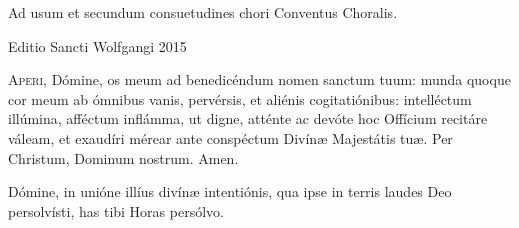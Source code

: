 \documentclass[a4paper, twoside, 12pt]{article}
\newcommand{\annusEditionis}{2015}
\begin{document}

\def\greinitialformat#1{%
{\color{red}\fontsize{38}{38}\selectfont #1}%
}

\pagestyle{empty}

\begin{titulusOfficii}
\end{titulusOfficii}

\vspace{1.5cm}
\begin{center}
\end{center}

\vfill

\begin{center}
Ad usum et secundum consuetudines chori \guillemotright{}Conventus Choralis\guillemotleft.

Editio Sancti Wolfgangi \annusEditionis
\end{center}

\pagebreak

\renewcommand{\headrulewidth}{0pt} %
\fancyhf{}
\pagestyle{fancy}


\lettrine{{\color{red}A}}{peri,} Dómine, os meum ad benedicéndum nomen sanctum tuum:
munda quoque cor meum ab ómnibus vanis, pervérsis, et aliénis
cogitatiónibus:
intelléctum illúmina, afféctum inflámma,
ut digne, atténte ac devóte hoc Offícium recitáre váleam,
et exaudíri mérear ante conspéctum Divínæ Majestátis tuæ.
Per Christum, Dominum nostrum.
\Rbardot{} Amen.

Dómine, in unióne illíus divínæ intentiónis,
qua ipse in terris laudes Deo persolvísti,
has tibi Horas  persólvo.


\vfill


\end{document}
